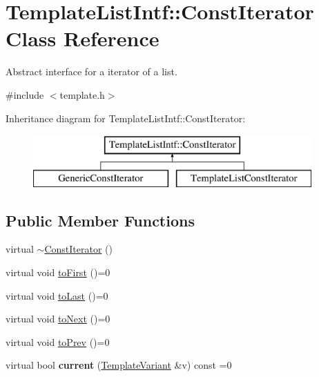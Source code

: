 \hypertarget{class_template_list_intf_1_1_const_iterator}{}\section{Template\+List\+Intf\+::Const\+Iterator Class Reference}
\label{class_template_list_intf_1_1_const_iterator}


Abstract interface for a iterator of a list.  




{\ttfamily \#include $<$template.\+h$>$}

Inheritance diagram for Template\+List\+Intf\+::Const\+Iterator\+:\begin{figure}[H]
\begin{center}
\leavevmode
\includegraphics[height=2.000000cm]{class_template_list_intf_1_1_const_iterator}
\end{center}
\end{figure}
\subsection*{Public Member Functions}
\begin{DoxyCompactItemize}
\item 
virtual \mbox{\hyperlink{class_template_list_intf_1_1_const_iterator_a831a69d0d66057405396a89fe2371567}{$\sim$\+Const\+Iterator}} ()
\item 
virtual void \mbox{\hyperlink{class_template_list_intf_1_1_const_iterator_ab0d366c70210b05cf32f465d953d3152}{to\+First}} ()=0
\item 
virtual void \mbox{\hyperlink{class_template_list_intf_1_1_const_iterator_acf5b37615cb4544e1b0cb5717a127900}{to\+Last}} ()=0
\item 
virtual void \mbox{\hyperlink{class_template_list_intf_1_1_const_iterator_a8656b1ee10ba2625ba91eadb78f8faf7}{to\+Next}} ()=0
\item 
virtual void \mbox{\hyperlink{class_template_list_intf_1_1_const_iterator_a9e5ce362eb61eb772df5afefa5703510}{to\+Prev}} ()=0
\item 
\mbox{\label{class_template_list_intf_1_1_const_iterator_ace488ab8a3bfd8b5b4766a9e77137175}} 
virtual bool {\bfseries current} (\mbox{\hyperlink{class_template_variant}{Template\+Variant}} \&v) const =0
\end{DoxyCompactItemize}


